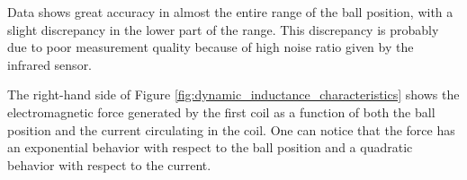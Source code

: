 Data shows great accuracy in almost the entire range of the ball position, with a slight discrepancy in the lower part of the range.
This discrepancy is probably due to poor measurement quality because of high noise ratio given by the infrared sensor.

The right-hand side of Figure \ref{fig:dynamic_inductance_characteristics} shows the electromagnetic force generated by the first coil as a function of both the ball position and the current circulating in the coil.
One can notice that the force has an exponential behavior with respect to the ball position and a quadratic behavior with respect to the current.